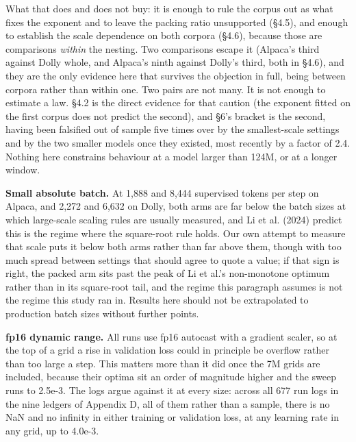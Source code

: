 \documentclass[11pt]{article}
\begin{document}
What that does and does not buy: it is enough to rule the corpus out as what fixes the exponent and to leave the packing ratio unsupported (\S{}4.5), and enough to establish the scale dependence on both corpora (\S{}4.6), because those are comparisons \emph{within} the nesting. Two comparisons escape it (Alpaca's third against Dolly whole, and Alpaca's ninth against Dolly's third, both in \S{}4.6), and they are the only evidence here that survives the objection in full, being between corpora rather than within one. Two pairs are not many. It is not enough to estimate a law. \S{}4.2 is the direct evidence for that caution (the exponent fitted on the first corpus does not predict the second), and \S{}6's bracket is the second, having been falsified out of sample five times over by the smallest-scale settings and by the two smaller models once they existed, most recently by a factor of 2.4. Nothing here constrains behaviour at a model larger than 124M, or at a longer window.

\textbf{Small absolute batch.} At 1,888 and 8,444 supervised tokens per step on Alpaca, and 2,272 and 6,632 on Dolly, both arms are far below the batch sizes at which large-scale scaling rules are usually measured, and Li et al. (2024) predict this is the regime where the square-root rule holds. Our own attempt to measure that scale puts it below both arms rather than far above them, though with too much spread between settings that should agree to quote a value; if that sign is right, the packed arm sits past the peak of Li et al.'s non-monotone optimum rather than in its square-root tail, and the regime this paragraph assumes is not the regime this study ran in. Results here should not be extrapolated to production batch sizes without further points.

\textbf{fp16 dynamic range.} All runs use fp16 autocast with a gradient scaler, so at the top of a grid a rise in validation loss could in principle be overflow rather than too large a step. This matters more than it did once the 7M grids are included, because their optima sit an order of magnitude higher and the sweep runs to 2.5e-3. The logs argue against it at every size: across all 677 run logs in the nine ledgers of Appendix D, all of them rather than a sample, there is no NaN and no infinity in either training or validation loss, at any learning rate in any grid, up to 4.0e-3.
\end{document}

